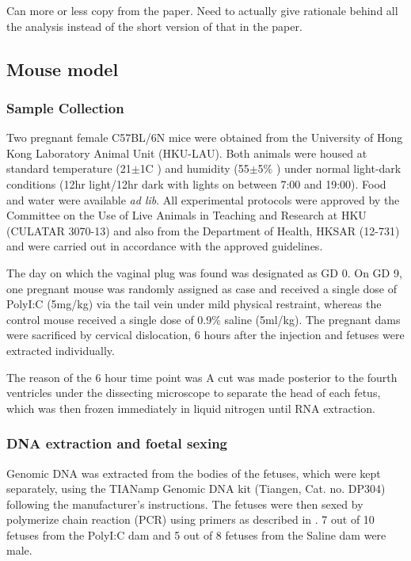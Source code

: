 

Can more or less copy from the paper. 
Need to actually give rationale behind all the analysis instead of the short version of that in the paper.
\subsection{Mouse model}
\subsubsection{Sample Collection}
Two pregnant female C57BL/6N mice were obtained from the University of Hong Kong Laboratory Animal Unit (HKU-LAU).
Both animals were housed at standard temperature (21$\pm$1\degree C ) and humidity (55$\pm$5$\%$ ) under normal light-dark conditions (12hr light/12hr dark with lights on between 7:00 and 19:00).
Food and water were available \textit{ad lib}.
All experimental protocols were approved by the Committee on the Use of Live Animals in Teaching and Research at HKU (CULATAR 3070-13) and also from the Department of Health, HKSAR (12-731) and were carried out in accordance with the approved guidelines. 

The day on which the vaginal plug was found was designated as GD 0.
On GD 9, one pregnant mouse was randomly assigned as case and received a single dose of PolyI:C (5mg/kg) via the tail vein under mild physical restraint, whereas the control mouse received a single dose of 0.9$\%$ saline (5ml/kg)\cite{Li2009c}.
The pregnant dams were sacrificed by cervical dislocation, 6 hours after the injection and fetuses were extracted individually.

The reason of the 6 hour time point was
A cut was made posterior to the fourth ventricles under the dissecting microscope to separate the head of each fetus\cite{Mason1993a}, which was then frozen immediately in liquid nitrogen until RNA extraction. 


\subsubsection{DNA extraction and foetal sexing}
Genomic DNA was extracted from the bodies of the fetuses, which were kept separately, using the TIANamp Genomic DNA kit (Tiangen, Cat. no. DP304) following the manufacturer's instructions.
The fetuses were then sexed by polymerize chain reaction (PCR) using primers as described in \citet{Clapcote2005}.
 7 out of 10 fetuses from the PolyI:C dam and 5 out of 8 fetuses from the Saline dam were male.


